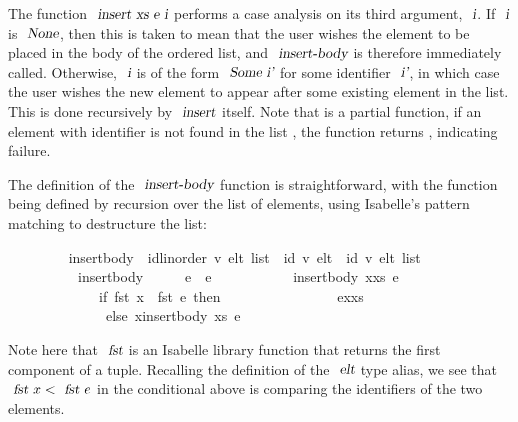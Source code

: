 \documentclass[acmlarge,review,anonymous]{acmart}\settopmatter{printfolios=true}
\begin{document}
The function $\isa{insert\ xs\ e\ i}$ performs a case analysis on its third argument, $\isa{i}$.
If $\isa{i}$ is $\isa{None}$, then this is taken to mean that the user wishes the element to be placed in the body of the ordered list, and $\isa{insert-body}$ is therefore immediately called.
Otherwise, $\isa{i}$ is of the form $\isa{Some\ i'}$ for some identifier $\isa{i'}$, in which case the user wishes the new element to appear after some existing element in the list.
This is done recursively by $\isa{insert}$ itself.
Note that  is a partial function, if an element with identifier  is not found in the list , the function returns , indicating failure.

The definition of the $\isa{insert-body}$ function is straightforward, with the function being defined by recursion over the list of elements, using Isabelle's pattern matching to destructure the list:
\\
\begin{isabellebody}
\ \ \ \ \ \ \ \  insert{\isacharunderscore}body\ {\isacharcolon}{\isacharcolon}\ {\isachardoublequoteopen}{\isacharparenleft}{\isacharprime}id{\isacharcolon}{\isacharcolon}{\isacharbraceleft}linorder{\isacharbraceright}{\isacharcomma}\ {\isacharprime}v{\isacharparenright}\ elt\ list\ {\isasymRightarrow}\ {\isacharparenleft}{\isacharprime}id{\isacharcomma}\ {\isacharprime}v{\isacharparenright}\ elt\ {\isasymRightarrow}\ {\isacharparenleft}{\isacharprime}id{\isacharcomma}\ {\isacharprime}v{\isacharparenright}\ elt\ list{\isachardoublequoteclose}\ \isanewline
\ \ \ \ \ \ \ \ \ \ {\isachardoublequoteopen}insert{\isacharunderscore}body\ {\isacharbrackleft}{\isacharbrackright}\ \ \ \ \ e\ {\isacharequal}\ {\isacharbrackleft}e{\isacharbrackright}{\isachardoublequoteclose}\ {\isacharbar}\isanewline
\ \ \ \ \ \ \ \ \ \ {\isachardoublequoteopen}insert{\isacharunderscore}body\ {\isacharparenleft}x{\isacharhash}xs{\isacharparenright}\ e\ {\isacharequal}\isanewline
\ \ \ \ \ \ \ \ \ \ \ \ \ {\isacharparenleft}if\ fst\ x\ {\isacharless}\ fst\ e\ then\isanewline
\ \ \ \ \ \ \ \ \ \ \ \ \ \ \ \ e{\isacharhash}x{\isacharhash}xs\isanewline
\ \ \ \ \ \ \ \ \ \ \ \ \ \ else\ x{\isacharhash}insert{\isacharunderscore}body\ xs\ e{\isacharparenright}{\isachardoublequoteclose}
\end{isabellebody}
\vspace{\baselineskip}
Note here that $\isa{fst}$ is an Isabelle library function that returns the first component of a tuple.
Recalling the definition of the $\isa{elt}$ type alias, we see that $\isa{fst}\ x < \isa{fst}\ e$ in the conditional above is comparing the identifiers of the two elements.
\end{document}
